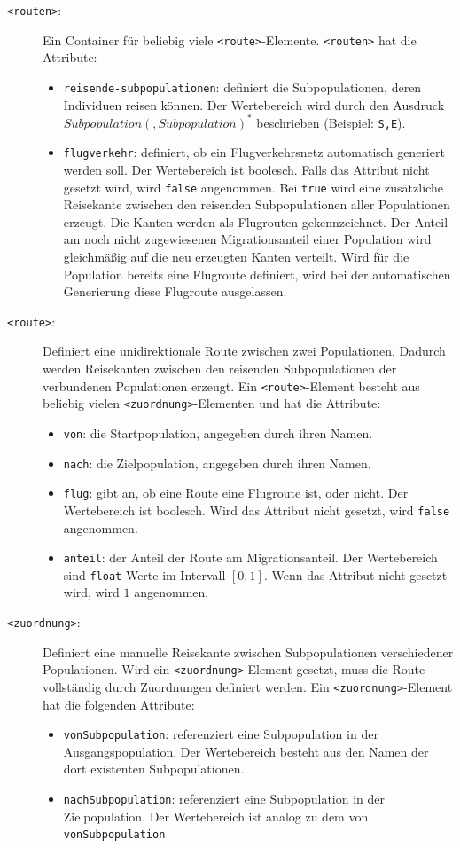 \begin{description}
\begin{itemize}
\end{itemize}
\item[\texttt{<routen>}:] Ein Container für beliebig viele \texttt{<route>}-Elemente. \texttt{<routen>} hat die Attribute:
\begin{itemize}
	\item \texttt{reisende-subpopulationen}: definiert die Subpopulationen, deren Individuen reisen können. Der Wertebereich wird durch den Ausdruck $Subpopulation(,Subpopulation)^*$ beschrieben (Beispiel: \texttt{S,E}). 
	\item \texttt{flugverkehr}: definiert, ob ein Flugverkehrsnetz automatisch generiert werden soll. Der Wertebereich ist boolesch. Falls das Attribut nicht gesetzt wird, wird \texttt{false} angenommen. Bei \texttt{true} wird eine zusätzliche Reisekante zwischen den reisenden Subpopulationen aller Populationen erzeugt. Die Kanten werden als Flugrouten gekennzeichnet. Der Anteil am noch nicht zugewiesenen Migrationsanteil einer Population wird gleichmäßig auf die neu erzeugten Kanten verteilt. Wird für die Population bereits eine Flugroute definiert, wird bei der automatischen Generierung diese Flugroute ausgelassen. 
\end{itemize}
\item[\texttt{<route>}:] Definiert eine unidirektionale Route zwischen zwei Populationen. Dadurch werden Reisekanten zwischen den reisenden Subpopulationen der verbundenen Populationen erzeugt. Ein \texttt{<route>}-Element besteht aus beliebig vielen \texttt{<zuordnung>}-Elementen und hat die Attribute:\begin{itemize}
	\item \texttt{von}: die Startpopulation, angegeben durch ihren Namen.
	\item \texttt{nach}: die Zielpopulation, angegeben durch ihren Namen.
	\item \texttt{flug}: gibt an, ob eine Route eine Flugroute ist, oder nicht. Der Wertebereich ist boolesch. Wird das Attribut nicht gesetzt, wird \texttt{false} angenommen.
	\item \texttt{anteil}: der Anteil der Route am Migrationsanteil. Der Wertebereich sind \texttt{float}-Werte im Intervall $[0,1]$. Wenn das Attribut nicht gesetzt wird, wird $1$ angenommen.
\end{itemize}
\item[\texttt{<zuordnung>}:] Definiert eine manuelle Reisekante zwischen Subpopulationen verschiedener Populationen. Wird ein \texttt{<zuordnung>}-Element gesetzt, muss die Route vollständig durch Zuordnungen definiert werden. Ein \texttt{<zuordnung>}-Element hat die folgenden Attribute:\begin{itemize}
	\item \texttt{vonSubpopulation}: referenziert eine Subpopulation in der Ausgangspopulation. Der Wertebereich besteht aus den Namen der dort existenten Subpopulationen. 
	\item \texttt{nachSubpopulation}: referenziert eine Subpopulation in der Zielpopulation. Der Wertebereich ist analog zu dem von \texttt{vonSubpopulation}
\end{itemize} 
\end{description}
